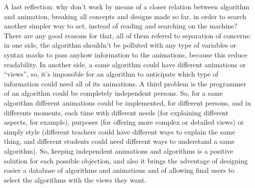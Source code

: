 \documentclass{article}
\begin{document}
A last reflection: why don't work by means of a closer relation between
algorithm and animation, breaking all concepts and designs made so far, in order
to search another simpler way to act, instead of reading and searching on the
machine? There are any good reasons for that, all of them refered to separation
of concerns: in one side, the algorithm shouldn't be polluted with any type of
variables or syntax marks to pass anyhow information to the animations, because
this reduce readability. In another side, a same algorithm could have different
animations or ``views'', so, it's impossible for an algorithm to anticipate
which type of information could need all of its animations. A third problem is
the programmer of an algorithm could be completely independent persons. So, for
a same algorithm different animations could be implemented, for different
persons, and in differents moments, each time with different needs (for
explaining different aspects, for example), purposes (for offering more complex
or detailed views) or simply style (different teachers could have different ways
to explain the same thing, and different students could need different ways to
understand a same algorithm). So, keeping independent animations and algorithms
is a positive solution for each possible objection, and also it brings the
adventage of designing easier a database of algorithms and animations and of
allowing final users to select the algorithms with the views they want.
\end{document}
